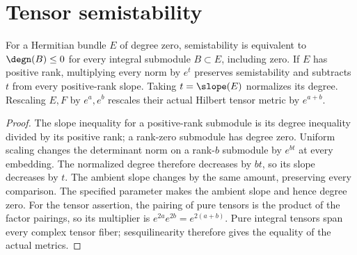 \chapter{Tensor semistability}

\begin{lemma}
\label{lem:semistable-normalization}
\leanok
For a Hermitian bundle $E$ of degree zero, semistability is equivalent
to $\degn(B)\leq0$ for every integral submodule $B\subset E$,
including zero. If $E$ has positive rank, multiplying every norm by
$e^t$ preserves semistability and subtracts $t$ from every
positive-rank slope. Taking $t=\slope(E)$ normalizes its degree.
Rescaling $E,F$ by $e^a,e^b$ rescales their actual Hilbert tensor
metric by $e^{a+b}$.
\end{lemma}
\begin{proof}
The slope inequality for a positive-rank submodule is its degree
inequality divided by its positive rank; a rank-zero submodule has
degree zero. Uniform scaling changes the determinant norm on a
rank-$b$ submodule by $e^{bt}$ at every embedding. The normalized
degree therefore decreases by $bt$, so its slope decreases by $t$.
The ambient slope changes by the same amount, preserving every
comparison. The specified parameter makes the ambient slope and
hence degree zero.
For the tensor assertion, the pairing of pure tensors is the product
of the factor pairings, so its multiplier is $e^{2a}e^{2b}=e^{2(a+b)}$.
Pure integral tensors span every complex tensor fiber; sesquilinearity
therefore gives the equality of the actual metrics.
\end{proof}

